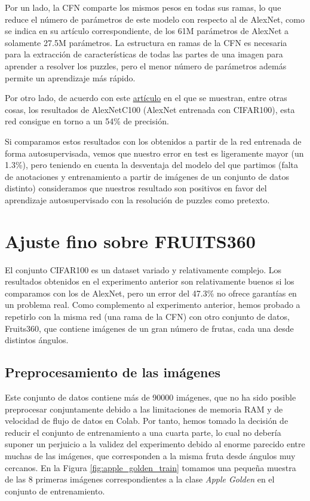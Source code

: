\documentclass[10pt,a4paper]{article}
\begin{document}
Por un lado, la CFN comparte los mismos pesos en todas sus ramas, lo que reduce el número de parámetros de este modelo con respecto al de AlexNet, como se indica en su artículo correspondiente, de los 61M parámetros de AlexNet a solamente 27.5M parámetros. La estructura en ramas de la CFN es necesaria para la extracción de características de todas las partes de una imagen para aprender a resolver los puzzles, pero el menor número de parámetros además permite un aprendizaje más rápido.

Por otro lado, de acuerdo con este \href{https://www.researchgate.net/publication/301835547_Network_of_Experts_for_Large-Scale_Image_Categorization}{artículo} en el que se muestran, entre otras cosas, los resultados de AlexNetC100 (AlexNet entrenada con CIFAR100), esta red consigue en torno a un 54\% de precisión.

Si comparamos estos resultados con los obtenidos a partir de la red entrenada de forma autosupervisada, vemos que nuestro error en test es ligeramente mayor (un 1.3\%), pero teniendo en cuenta la desventaja del modelo del que partimos (falta de anotaciones y entrenamiento a partir de imágenes de un conjunto de datos distinto) consideramos que nuestros resultado son positivos en favor del aprendizaje autosupervisado con la resolución de puzzles como pretexto.






\newpage
\section{Ajuste fino sobre FRUITS360}

El conjunto CIFAR100 es un dataset variado y relativamente complejo. Los resultados obtenidos en el experimento anterior son relativamente buenos si los comparamos con los de AlexNet, pero un error del 47.3\% no ofrece garantías en un problema real. Como complemento al experimento anterior, hemos probado a repetirlo con la misma red (una rama de la CFN) con otro conjunto de datos, Fruits360, que contiene imágenes de un gran número de frutas, cada una desde distintos ángulos.

\subsection{Preprocesamiento de las imágenes}

Este conjunto de datos contiene más de 90000 imágenes, que no ha sido posible preprocesar conjuntamente  debido a las limitaciones de memoria RAM y de velocidad de flujo de datos en Colab. Por tanto, hemos tomado la decisión de reducir el conjunto de entrenamiento a una cuarta parte, lo cual no debería suponer un perjuicio a la validez del experimento debido al enorme parecido entre muchas de las imágenes, que corresponden a la misma fruta desde ángulos muy cercanos. En la Figura \ref{fig:apple_golden_train} tomamos una pequeña muestra de las 8 primeras imágenes correspondientes a la clase \textit{Apple Golden} en el conjunto de entrenamiento.
\end{document}
